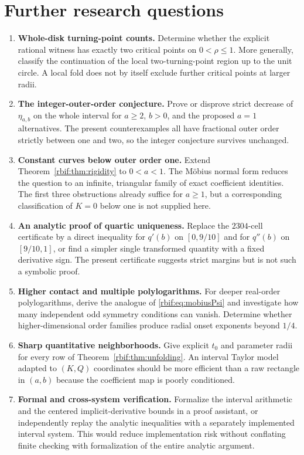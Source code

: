\section{Further research questions}
\label{rbif:sec:future}
\begin{enumerate}[label=\textbf{\arabic*.},leftmargin=*]
\item \textbf{Whole-disk turning-point counts.}
Determine whether the explicit rational witness has exactly two critical
points on $0<\rho\le1$. More generally, classify the continuation of the
local two-turning-point region up to the unit circle. A local fold does
not by itself exclude further critical points at larger radii.
\item \textbf{The integer-outer-order conjecture.}
Prove or disprove strict decrease of $\eta_{a,b}$ on the whole interval
for $a\ge2$, $b>0$, and the proposed $a=1$ alternatives. The present
counterexamples all have fractional outer order strictly between one
and two, so the integer conjecture survives unchanged.
\item \textbf{Constant curves below outer order one.}
Extend Theorem~\ref{rbif:thm:rigidity} to $0<a<1$. The M\"obius normal
form reduces the question to an infinite, triangular family of exact
coefficient identities. The first three obstructions already suffice
for $a\ge1$, but a corresponding classification of $K=0$ below one is
not supplied here.
\item \textbf{An analytic proof of quartic uniqueness.}
Replace the $2304$-cell certificate by a direct inequality for
$q'(b)$ on $[0,9/10]$ and for $q''(b)$ on $[9/10,1]$, or find a simpler
single transformed quantity with a fixed derivative sign. The present
certificate suggests strict margins but is not such a symbolic proof.
\item \textbf{Higher contact and multiple polylogarithms.}
For deeper real-order polylogarithms, derive the analogue of
\eqref{rbif:eq:mobiusPsi} and investigate how many independent odd
symmetry conditions can vanish. Determine whether higher-dimensional
order families produce radial onset exponents beyond $1/4$.
\item \textbf{Sharp quantitative neighborhoods.}
Give explicit $t_0$ and parameter radii for every row of
Theorem~\ref{rbif:thm:unfolding}. An interval Taylor model adapted to
$(K,Q)$ coordinates should be more efficient than a raw rectangle in
$(a,b)$ because the coefficient map is poorly conditioned.
\item \textbf{Formal and cross-system verification.}
Formalize the interval arithmetic and the centered implicit-derivative
bounds in a proof assistant, or independently replay the analytic
inequalities with a separately implemented interval system. This would
reduce implementation risk without conflating finite checking with
formalization of the entire analytic argument.
\end{enumerate}

